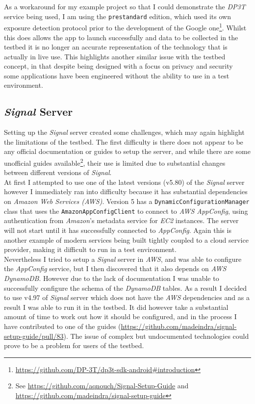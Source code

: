 \documentclass[
    author={Jacob Daniel Halsey},
    supervisor={Prof. Awais Rashid},
    degree={BSc},
    title={Building a Testbed for Evaluating Privacy Enhancing Technologies  (PETs)},
    subtitle={},
    type={software development},
    year={2021}
]{dissertation}
\begin{document}
As a workaround for my example project so that I could demonstrate the \emph{DP3T} service being used,
I am using the \texttt{prestandard} edition, which used its own exposure detection protocol prior to the development
of the Google one\footnote{\url{https://github.com/DP-3T/dp3t-sdk-android\#introduction}}. 
Whilst this does allows the app to launch successfully and data to be collected in the testbed
it is no longer an accurate representation of the technology that is actually in live use. This highlights another
similar issue with the testbed concept, in that despite being designed with a focus on privacy and security~\cite{gaen}
some applications have been engineered without the ability to use in a test environment.

\subsection{\emph{Signal} Server}

Setting up the \emph{Signal} server created some challenges, which may again highlight the limitations
of the testbed. The first difficulty is there does not appear to be any official documentation
or guides to setup the server, and while there are some unofficial guides 
available\footnote{See \url{https://github.com/aqnouch/Signal-Setup-Guide} and \url{https://github.com/madeindra/signal-setup-guide}}, their use is limited
due to substantial changes between different versions of \emph{Signal}. \\

At first I attempted to use one of the latest versions (v5.80) of the \emph{Signal} server
however I immediately ran into difficulty because it has substantial dependencies on \emph{Amazon Web Services (AWS)}.
Version 5 has a \lstinline[language=java]|DynamicConfigurationManager| class that uses the 
\lstinline[language=java]|AmazonAppConfigClient| to connect to \emph{AWS AppConfig}, using authentication
from \emph{Amazon}'s metadata service for \emph{EC2} instances. The server will not start until it has
successfully connected to \emph{AppConfig}. Again this is another example of modern services being
built tightly coupled to a cloud service provider, making it difficult to run in a test environment. \\

Nevertheless I tried to setup a \emph{Signal} server in \emph{AWS}, and was able to configure
the \emph{AppConfig} service, but I then discovered that it also depends on \emph{AWS DynamoDB}.
However due to the lack of documentation I was unable to successfully configure the
schema of the \emph{DynamoDB} tables. As a result I decided to use v4.97 of \emph{Signal}
server which does not have the \emph{AWS} dependencies and as a result I was able to run it in the testbed.
It did however take a substantial amount of time to work out how it should be configured, and in the 
process I have contributed to one of the guides (\url{https://github.com/madeindra/signal-setup-guide/pull/83}).
The issue of complex but undocumented technologies could prove to be a problem for users of the testbed.
\end{document}

